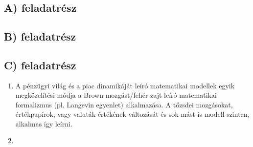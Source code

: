 \section{}
\subsection*{A) feladatrész}


\subsection*{B) feladatrész}

\subsection*{C) feladatrész}
\begin{enumerate}
    \item A pénzügyi világ és a piac dinamikáját leíró matematikai modellek egyik megközelítési módja a Brown-mozgást/fehér zajt leíró matematikai formalizmus (pl. Langevin egyenlet\cite{2013ChPhL..30h8901T}) alkalmazása. A tőzsdei mozgásokat, értékpapírok, vagy valuták értékének változását és sok mást is modell szinten, alkalmas így leírni.
    \item 
\end{enumerate}